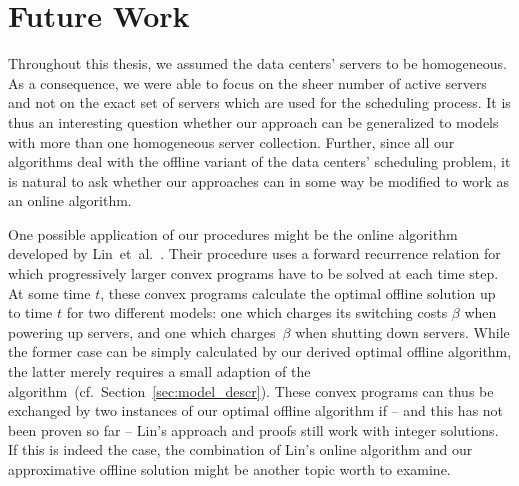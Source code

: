 \section{Future Work}
Throughout this thesis, we assumed the data centers' servers to be homogeneous. As a consequence, we were able to focus on the sheer number of active servers and not on the exact set of servers which are used for the scheduling process. It is thus an interesting question whether our approach can be generalized to models with more than one homogeneous server collection.
Further, since all our algorithms deal with the offline variant of the data centers' scheduling problem, it is natural to ask whether our approaches can in some way be modified to work as an online algorithm. 

One possible application of our procedures might be the online algorithm developed by Lin~et~al.~\parencite{dyn-right-sizing}. Their procedure uses a forward recurrence relation for which progressively larger convex programs have to be solved at each time step. At some time $t$, these convex programs calculate the optimal offline solution up to time $t$ for two different models: one which charges its switching costs $\beta$ when powering up servers, and one which charges~$\beta$ when shutting down servers. While the former case can be simply calculated by our derived optimal offline algorithm, the latter merely requires a small adaption of the algorithm~(cf.\ Section~\ref{sec:model_descr}). These convex programs can thus be exchanged by two instances of our optimal offline algorithm if -- and this has not been proven so far -- Lin's approach and proofs still work with integer solutions. If this is indeed the case, the combination of Lin's online algorithm and our approximative offline solution might be another topic worth to examine.
